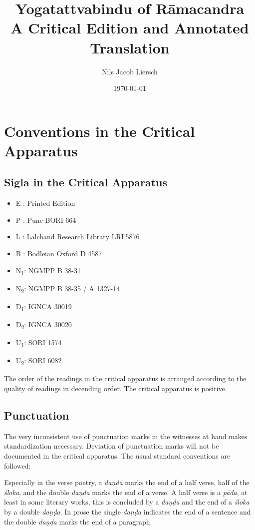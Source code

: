 \documentclass[12pt]{article}%
\author{Nils Jacob Liersch}
\title{Yogatattvabindu of Rāmacandra\\ A Critical Edition and Annotated Translation}
\date{\today}
\def\acpc#1#2#3{{#1}\rlap{\textrm{\textsuperscript{#3}}}\textsubscript{\textrm{#2}}\space}
\def\sigl#1#2{{{#1}}\textsubscript{\textrm{#2}}}
\def\None{{\sigl{N}{1}}} \def\Noneac{\acpc{N}{1}{ac}\,} \def\Nonepc{\acpc{N}{1}{pc}\,}
\def\Ntwo{{\sigl{N}{2}}} \def\Noneac{\acpc{N}{2}{ac}\,} \def\Nonepc{\acpc{N}{2}{pc}\,}
\def\Done{{\sigl{D}{1}}} \def\Doneac{\acpc{D}{1}{ac}\,} \def\Donepc{\acpc{D}{1}{pc}\,}
\def\Dtwo{{\sigl{D}{2}}} \def\Dtwoac{\acpc{D}{2}{ac}\,} \def\Dtwopc{\acpc{D}{2}{pc}\,}
\def\Uone{{\sigl{U}{1}}} \def\Uoneac{\acpc{U}{1}{ac}\,} \def\Uonepc{\acpc{U}{1}{pc}\,}
\def\Utwo{{\sigl{U}{2}}} \def\Utwoac{\acpc{U}{2}{ac}\,} \def\Utwopc{\acpc{U}{2}{pc}\,}
\begin{document}
\maketitle
\clearpage

\section{Conventions in the Critical Apparatus}
\subsection{Sigla in the Critical Apparatus}

\begin{itemize}
\item E : Printed Edition
\item P : Pune BORI 664
\item L : Lalchand Research Library LRL5876
\item B : Bodleian Oxford D 4587
\item \None : NGMPP B 38-31
\item \Ntwo : NGMPP B 38-35 / A 1327-14
\item \Done : IGNCA 30019
\item \Dtwo : IGNCA 30020
\item \Uone : SORI 1574
\item \Utwo: SORI 6082
\end{itemize}

The order of the readings in the critical apparatus is arranged according to the quality of readings in decending order. The critical apparatus is positive. 

\subsection{Punctuation}

The very inconsistent use of punctuation marks in the witnesses at hand makes standardization necessary. Deviation of punctuation marks will not be documented in the critical apparatus. The usual standard conventions are followed:

Especially in the verse poetry, a \textit{daṇḍa} marks the end of a half verse, half of the \textit{śloka}, and the double \textit{daṇḍa} marks the end of a verse. A half verse is a \textit{pāda}, at least in some literary works, this is concluded by a \textit{daṇḍa} and the end of a \textit{śloka} by a double \textit{daṇḍa}. In prose the single \textit{daṇḍa} indicates the end of a sentence and the double \textit{daṇḍa} marks the end of a paragraph.
\end{document}
